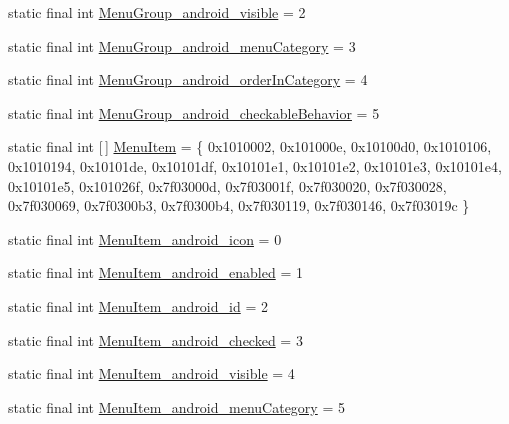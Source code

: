 \begin{DoxyCompactItemize}
\item 
static final int \mbox{\hyperlink{classandroid_1_1support_1_1design_1_1_r_1_1styleable_ab7b47c5aa76f22fc272f685f8f50c208}{Menu\+Group\+\_\+android\+\_\+visible}} = 2
\item 
static final int \mbox{\hyperlink{classandroid_1_1support_1_1design_1_1_r_1_1styleable_a650e6468d9a014506f9e2b1ca9185cbb}{Menu\+Group\+\_\+android\+\_\+menu\+Category}} = 3
\item 
static final int \mbox{\hyperlink{classandroid_1_1support_1_1design_1_1_r_1_1styleable_a919b5d091d76ee965d77c57ff5b12647}{Menu\+Group\+\_\+android\+\_\+order\+In\+Category}} = 4
\item 
static final int \mbox{\hyperlink{classandroid_1_1support_1_1design_1_1_r_1_1styleable_a6a6b6fb9de4775a9eea3bdded6d73190}{Menu\+Group\+\_\+android\+\_\+checkable\+Behavior}} = 5
\item 
static final int \mbox{[}$\,$\mbox{]} \mbox{\hyperlink{classandroid_1_1support_1_1design_1_1_r_1_1styleable_a4c90afdbb461f2bfba191da26fbc881c}{Menu\+Item}} = \{ 0x1010002, 0x101000e, 0x10100d0, 0x1010106, 0x1010194, 0x10101de, 0x10101df, 0x10101e1, 0x10101e2, 0x10101e3, 0x10101e4, 0x10101e5, 0x101026f, 0x7f03000d, 0x7f03001f, 0x7f030020, 0x7f030028, 0x7f030069, 0x7f0300b3, 0x7f0300b4, 0x7f030119, 0x7f030146, 0x7f03019c \}
\item 
static final int \mbox{\hyperlink{classandroid_1_1support_1_1design_1_1_r_1_1styleable_af91278f37536d24b0e1d2283762c5fbc}{Menu\+Item\+\_\+android\+\_\+icon}} = 0
\item 
static final int \mbox{\hyperlink{classandroid_1_1support_1_1design_1_1_r_1_1styleable_abd762da4c362160343aaeb4245f156d0}{Menu\+Item\+\_\+android\+\_\+enabled}} = 1
\item 
static final int \mbox{\hyperlink{classandroid_1_1support_1_1design_1_1_r_1_1styleable_a688e7ac77808e73ad90df268df497de0}{Menu\+Item\+\_\+android\+\_\+id}} = 2
\item 
static final int \mbox{\hyperlink{classandroid_1_1support_1_1design_1_1_r_1_1styleable_a79fceb6522155a29f63b64bce1292103}{Menu\+Item\+\_\+android\+\_\+checked}} = 3
\item 
static final int \mbox{\hyperlink{classandroid_1_1support_1_1design_1_1_r_1_1styleable_a486cad97abff8c88928c986faf3eee69}{Menu\+Item\+\_\+android\+\_\+visible}} = 4
\item 
static final int \mbox{\hyperlink{classandroid_1_1support_1_1design_1_1_r_1_1styleable_afe9e14a41f38cc5f9610d2017e624dbb}{Menu\+Item\+\_\+android\+\_\+menu\+Category}} = 5

\end{DoxyCompactItemize}
